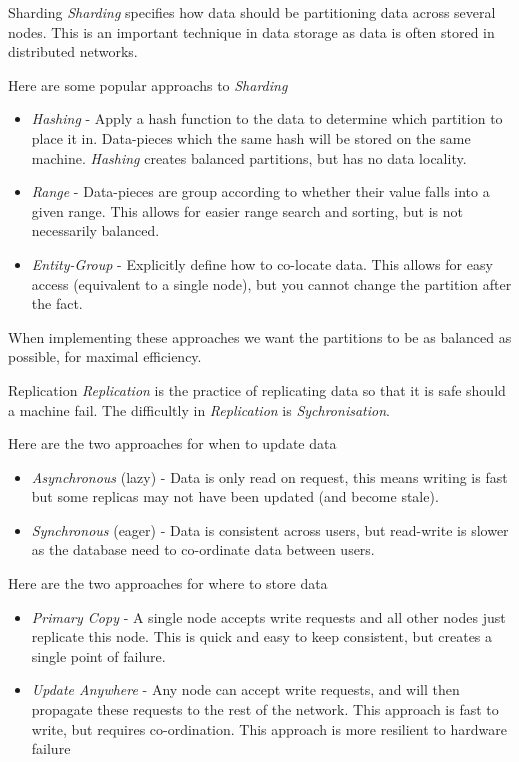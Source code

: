 \documentclass[11pt,a4paper]{article}
\begin{document}
  \begin{definition}{Sharding}
    \textit{Sharding} specifies how data should be partitioning data across several nodes. This is an important technique in data storage as data is often stored in distributed networks.
    \par Here are some popular approachs to \textit{Sharding}
    \begin{itemize}
      \item \textit{Hashing} - Apply a hash function to the data to determine which partition to place it in. Data-pieces which the same hash will be stored on the same machine. \textit{Hashing} creates balanced partitions, but has no data locality.
      \item \textit{Range} - Data-pieces are group according to whether their value falls into a given range. This allows for easier range search and sorting, but is not necessarily balanced.
      \item \textit{Entity-Group} - Explicitly define how to co-locate data. This allows for easy access (equivalent to a single node), but you cannot change the partition after the fact.
    \end{itemize}
    When implementing these approaches we want the partitions to be as balanced as possible, for maximal efficiency.
  \end{definition}

  \begin{definition}{Replication}
    \textit{Replication} is the practice of replicating data so that it is safe should a machine fail. The difficultly in \textit{Replication} is \textit{Sychronisation}.
    \par Here are the two approaches for when to update data
    \begin{itemize}
      \item \textit{Asynchronous} (lazy) - Data is only read on request, this means writing is fast but some replicas may not have been updated (and become stale).
      \item \textit{Synchronous} (eager) - Data is consistent across users, but read-write is slower as the database need to co-ordinate data between users.
    \end{itemize}
    \par Here are the two approaches for where to store data
    \begin{itemize}
      \item \textit{Primary Copy} - A single node accepts write requests and all other nodes just replicate this node. This is quick and easy to keep consistent, but creates a single point of failure.
      \item \textit{Update Anywhere} - Any node can accept write requests, and will then propagate these requests to the rest of the network. This approach is fast to write, but requires co-ordination. This approach is more resilient to hardware failure
    \end{itemize}
  \end{definition}
\end{document}
